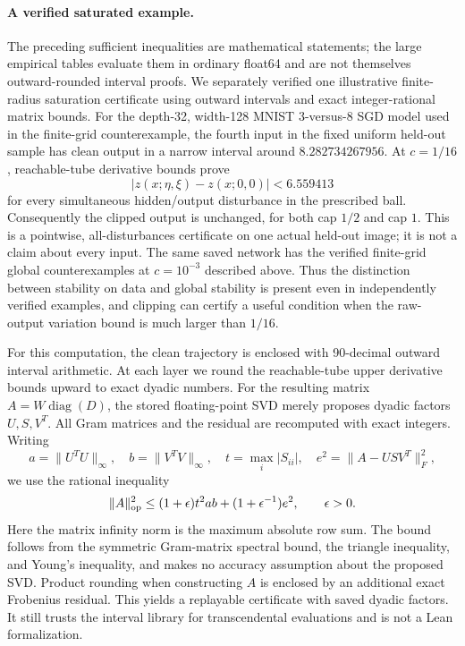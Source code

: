 \paragraph{A verified saturated example.}
The preceding sufficient inequalities are mathematical statements; the large empirical tables evaluate them in ordinary float64 and are not themselves outward-rounded interval proofs.  We separately verified one illustrative finite-radius saturation certificate using outward intervals and exact integer-rational matrix bounds.  For the depth-32, width-128 MNIST 3-versus-8 SGD model used in the finite-grid counterexample, the fourth input in the fixed uniform held-out sample has clean output in a narrow interval around $8.282734267956$.  At $c=1/16$, reachable-tube derivative bounds prove
\[
 |z(x;\eta,\xi)-z(x;0,0)|<6.559413
\]
for every simultaneous hidden/output disturbance in the prescribed ball.  Consequently the clipped output is unchanged, for both cap $1/2$ and cap $1$.  This is a pointwise, all-disturbances certificate on one actual held-out image; it is not a claim about every input.  The same saved network has the verified finite-grid global counterexamples at $c=10^{-3}$ described above.  Thus the distinction between stability on data and global stability is present even in independently verified examples, and clipping can certify a useful condition when the raw-output variation bound is much larger than $1/16$.

For this computation, the clean trajectory is enclosed with 90-decimal outward interval arithmetic.  At each layer we round the reachable-tube upper derivative bounds upward to exact dyadic numbers.  For the resulting matrix $A=W\operatorname{diag}(D)$, the stored floating-point SVD merely proposes dyadic factors $U,S,V^T$.  All Gram matrices and the residual are recomputed with exact integers.  Writing
\[
 a=\|U^TU\|_\infty,\quad b=\|V^TV\|_\infty,
 \quad t=\max_i|S_{ii}|,\quad e^2=\|A-USV^T\|_F^2,
\]
we use the rational inequality
\[
 \|A\|_{\rm op}^2
 \le (1+\epsilon)t^2ab+(1+\epsilon^{-1})e^2,
 \qquad \epsilon>0.
\]
Here the matrix infinity norm is the maximum absolute row sum.  The bound follows from the symmetric Gram-matrix spectral bound, the triangle inequality, and Young's inequality, and makes no accuracy assumption about the proposed SVD.  Product rounding when constructing $A$ is enclosed by an additional exact Frobenius residual.  This yields a replayable certificate with saved dyadic factors.  It still trusts the interval library for transcendental evaluations and is not a Lean formalization.

